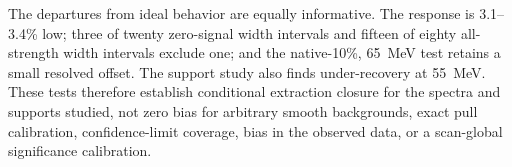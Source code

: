 The departures from ideal behavior are equally informative. The response is 3.1--3.4\%
low; three of twenty zero-signal width intervals and fifteen of eighty all-strength
width intervals exclude one; and the native-10\%, 65~MeV test retains a small resolved
offset. The support study also finds under-recovery at 55~MeV. These tests therefore
establish conditional extraction closure for the spectra and supports studied, not
zero bias for arbitrary smooth backgrounds, exact pull calibration, confidence-limit
coverage, bias in the observed data, or a scan-global significance calibration.
